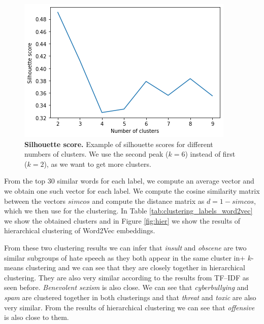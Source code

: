 \documentclass[fleqn,moreauthors,10pt]{ds_report}
\begin{document}
\begin{figure}[htb]\centering
	\includegraphics[width=\linewidth]{silh.png}
	\caption{\textbf{Silhouette score.} Example of silhouette scores for different numbers of clusters. We use the second peak ($k = 6$) instead of first ($k = 2$), as we want to get more clusters.}
	\label{fig:silh}
\end{figure}

From the top 30 similar words for each label, we compute an average vector and we obtain one such vector for each label. We compute the cosine similarity matrix between the vectors $simcos$ and compute the distance matrix as $d = 1 - simcos$, which we then use for the clustering. In Table \ref{tab:clustering_labels_word2vec} we show the obtained clusters and in Figure \ref{fig:hier} we show the results of hierarchical clustering of Word2Vec embeddings.

From these two clustering results we can infer that \textit{insult} and \textit{obscene} are two similar subgroups of hate speech as they both appear in the same cluster in+ $k$-means clustering and we can see that they are closely together in hierarchical clustering. They are also very similar according to the results from TF--IDF as seen before. \textit{Benevolent sexism} is also close. We can see that \textit{cyberbullying} and \textit{spam} are clustered together in both clusterings and that \textit{threat} and \textit{toxic} are also very similar. From the results of hierarchical clustering we can see that \textit{offensive} is also close to them.
\end{document}
